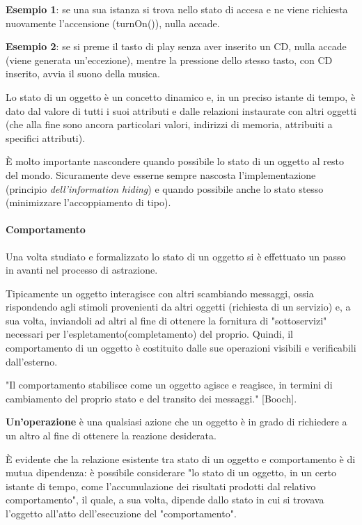 \textbf{Esempio 1}: se una sua istanza si trova nello stato di accesa e ne viene richiesta nuovamente l'accensione (turnOn()), nulla accade.

\textbf{Esempio 2}: se si preme il tasto di play senza aver inserito un CD, nulla accade (viene generata un'eccezione), mentre la pressione dello stesso tasto, con CD inserito, avvia il suono della musica.

Lo stato di un oggetto è un concetto dinamico e, in un preciso istante di tempo, è dato dal valore di tutti i suoi attributi e dalle relazioni instaurate con altri oggetti (che alla fine sono ancora particolari valori, indirizzi di memoria, attribuiti a specifici attributi).

È molto importante nascondere quando possibile lo stato di un oggetto al resto del mondo. Sicuramente deve esserne sempre nascosta l'implementazione (principio \textit{dell'information hiding}) e quando possibile anche lo stato stesso (minimizzare l'accoppiamento di tipo).

\paragraph{Comportamento}

Una volta studiato e formalizzato lo stato di un oggetto si è effettuato un passo in avanti nel processo di astrazione.

Tipicamente un oggetto interagisce con altri scambiando messaggi, ossia rispondendo agli stimoli provenienti da altri oggetti (richiesta di un servizio) e, a sua volta, inviandoli ad altri al fine di ottenere la fornitura di "sottoservizi" necessari per l'espletamento(completamento) del proprio. Quindi, il comportamento di un oggetto è costituito dalle sue operazioni visibili e verificabili dall'esterno.

"Il comportamento stabilisce come un oggetto agisce e reagisce, in termini di cambiamento del proprio stato e del transito dei messaggi." [Booch].

\textbf{Un'operazione} è una qualsiasi azione che un oggetto è in grado di richiedere a un altro al fine di ottenere la reazione desiderata.

È evidente che la relazione esistente tra stato di un oggetto e comportamento è di mutua dipendenza: è possibile considerare "lo stato di un oggetto, in un certo istante di tempo, come l'accumulazione dei risultati prodotti dal relativo comportamento", il quale, a sua volta, dipende dallo stato in cui si trovava l'oggetto all'atto dell'esecuzione del "comportamento".

